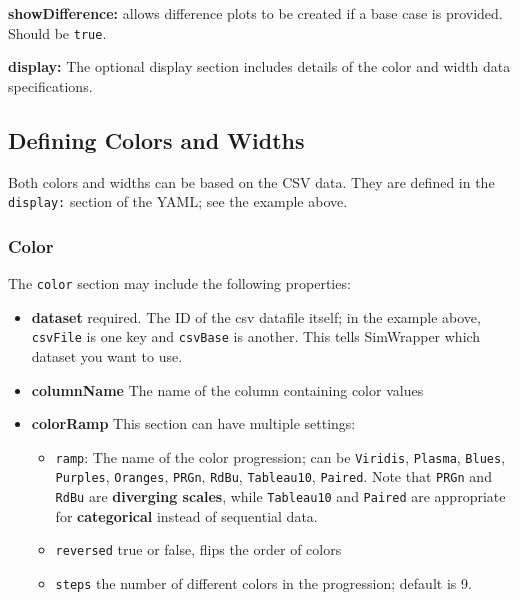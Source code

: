 \noindent\textbf{showDifference:} allows difference plots to be created if a base
case is provided. Should be \texttt{true}.

\noindent\textbf{display:} The optional display section includes details of the
color and width data specifications.

\hypertarget{defining-colors-and-widths}{%
\subsection{Defining Colors and
Widths}\label{defining-colors-and-widths}}

Both colors and widths can be based on the CSV data. They are defined in
the \texttt{display:} section of the YAML; see the example above.

\hypertarget{color}{%
\subsubsection{Color}\label{color}}

The \texttt{color} section may include the following properties:

\begin{itemize}
\tightlist
\item
  \textbf{dataset} required. The ID of the csv datafile itself; in the
  example above, \texttt{csvFile} is one key and \texttt{csvBase} is
  another. This tells SimWrapper which dataset you want to use.
\item
  \textbf{columnName} The name of the column containing color values
\item
  \textbf{colorRamp} This section can have multiple settings:

  \begin{itemize}
  \tightlist
  \item
    \texttt{ramp}: The name of the color progression; can be
    \texttt{Viridis}, \texttt{Plasma}, \texttt{Blues}, \texttt{Purples},
    \texttt{Oranges}, \texttt{PRGn}, \texttt{RdBu}, \texttt{Tableau10},
    \texttt{Paired}. Note that \texttt{PRGn} and \texttt{RdBu} are
    \textbf{diverging scales}, while \texttt{Tableau10} and
    \texttt{Paired} are appropriate for \textbf{categorical} instead of
    sequential data.
  \item
    \texttt{reversed} true or false, flips the order of colors
  \item
    \texttt{steps} the number of different colors in the progression;
    default is 9.
  \end{itemize}
\end{itemize}

